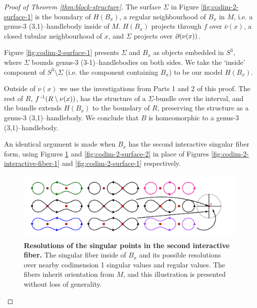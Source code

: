\begin{proof}[Proof of Theorem \ref{thm:block-structure}]
	The surface $\Sigma$ in Figure \ref{fig:codim-2-surface-1} is the boundary of $H(B_x)$, a regular neighbourhood of $B_x$ in $M$, i.e. a genus-3 (3,1)--handlebody inside of $M$.
	$H(B_x)$ projects through $f$ over $\bar\nu(x)$, a closed tubular neighbourhood of $x$, and $\Sigma$ projects over $\partial(\nu(x))$.
	
	Figure \ref{fig:codim-2-surface-1} presents $\Sigma$ and $B_x$ as objects embedded in $S^3$, where $\Sigma$ bounds genus-3 (3-1)--handlebodies on both sides.
	We take the `inside' component of $S^3\setminus\Sigma$ (i.e. the component containing $B_x$) to be our model $H(B_x)$.
	
	Outside of $\nu(x)$ we use the investigations from Parts 1 and 2 of this proof. The rest of $R$, $f^{\,\text{-}1}(R\setminus\nu(x))$, has the structure of a $\Sigma$-bundle over the interval, and the bundle extends $H(B_x)$ to the boundary of $R$, preserving the structure as a genus-3 (3,1)--handlebody.
	We conclude that $B$ is homeomorphic to a genus-3 (3,1)--handlebody.
	
	An identical argument is made when $B_x$ has the second interactive singular fiber form, using Figures \ref{fig:codim-2-interactive-fiber-2} and \ref{fig:codim-2-surface-2} in place of Figures \ref{fig:codim-2-interactive-fiber-1} and \ref{fig:codim-2-surface-1} respectively.
	
	\begin{figure}[h!]
		\centering
		\includegraphics[width=\textwidth]{figures/codim-2-interactive-fiber-2.png}
		\caption{
			\textbf{Resolutions of the singular points in the second interactive fiber.}
			The singular fiber inside of $B_x$ and its possible resolutions over nearby codimension 1 singular values and regular values.
			The fibers inherit orientation from $M$, and this illustration is presented without loss of generality.
		}
		\label{fig:codim-2-interactive-fiber-2}
	\end{figure}


\end{proof}
